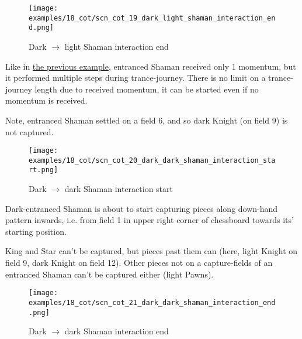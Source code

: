 \clearpage %

\noindent
\begin{figure}[!h]
\texttt{[image: examples/18\_cot/scn\_cot\_19\_dark\_light\_shaman\_interaction\_end.png]}
\caption{Dark $\rightarrow$ light Shaman interaction end}
\label{fig:scn_cot_19_dark_light_shaman_interaction_end}
\end{figure}

Like in \hyperref[fig:scn_cot_16_light_light_shaman_interaction_start]{the previous example},
entranced Shaman received only 1 momentum, but it performed multiple steps during trance-journey.
There is no limit on a trance-journey length due to received momentum, it can be started even if
no momentum is received.

Note, entranced Shaman settled on a field 6, and so dark Knight (on field 9) is not captured.

\clearpage %

\noindent
\begin{figure}[!h]
\texttt{[image: examples/18\_cot/scn\_cot\_20\_dark\_dark\_shaman\_interaction\_start.png]}
\caption{Dark $\rightarrow$ dark Shaman interaction start}
\label{fig:scn_cot_20_dark_dark_shaman_interaction_start}
\end{figure}

Dark-entranced Shaman is about to start capturing pieces along down-hand pattern inwards,
i.e. from field 1 in upper right corner of chessboard towards its' starting position.

King and Star can't be captured, but pieces past them can (here, light Knight on field 9,
dark Knight on field 12). Other pieces not on a capture-fields of an entranced Shaman can't
be captured either (light Pawns).

\clearpage %

\noindent
\begin{figure}[!h]
\texttt{[image: examples/18\_cot/scn\_cot\_21\_dark\_dark\_shaman\_interaction\_end.png]}
\caption{Dark $\rightarrow$ dark Shaman interaction end}
\label{fig:scn_cot_21_dark_dark_shaman_interaction_end}
\end{figure}

